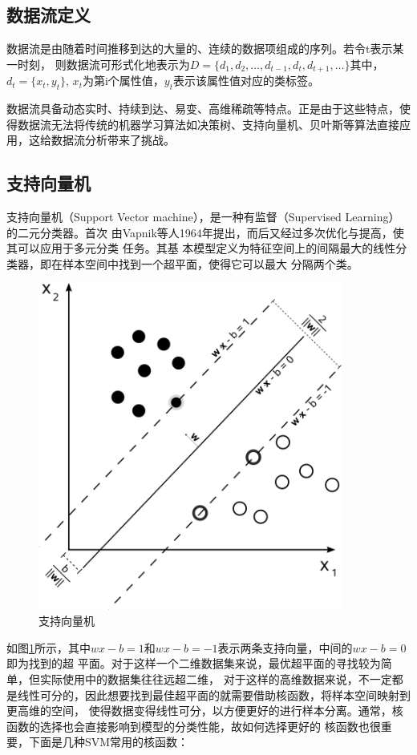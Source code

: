\subsection{数据流定义}
数据流是由随着时间推移到达的大量的、连续的数据项组成的序列\cite{陈火旺A}。若令t表示某一时刻，
则数据流可形式化地表示为$D=\{d_1,d_2,…,d_{t-1},d_{t},d_{t+1},…\}$其中，$d_t=\{x_{t},y_{t}\}$,
$x_{t}$为第i个属性值，$y_{t}$表示该属性值对应的类标签。

数据流具备动态实时、持续到达、易变、高维稀疏等特点。正是由于这些特点，使得数据流无法将传统的机器学习算法如决策树、支持向量机、贝叶斯等算法直接应用，这给数据流分析带来了挑战。

\subsection{支持向量机}
支持向量机（Support Vector machine），是一种有监督（Supervised Learning）
\cite{russell2002artificial} 的二元分类器。首次
由Vapnik等人1964年提出\cite{Vapnik1964A}，而后又经过多次优化与提高，使其可以应用于多元分类
任务\cite{Hsu2002A}。其基
本模型定义为特征空间上的间隔最大的线性分类器，即在样本空间中找到一个超平面，使得它可以最大
分隔两个类。

\begin{figure}[H]
  \centering
  \includegraphics[width=10cm]{./figs/svm.png}
  \caption{支持向量机}
  \label{fig:svm}
\end{figure}

如图\ref{fig:svm}所示，其中$wx-b=1$和$wx-b=-1$表示两条支持向量，中间的$wx-b=0$即为找到的超
平面。对于这样一个二维数据集来说，最优超平面的寻找较为简单，但实际使用中的数据集往往远超二维，
对于这样的高维数据来说，不一定都是线性可分的，因此想要找到最佳超平面的就需要借助核函数，将样本空间映射到更高维的空间，
使得数据变得线性可分，以方便更好的进行样本分离。通常，核函数的选择也会直接影响到模型的分类性能，故如何选择更好的
核函数也很重要，下面是几种SVM常用的核函数：

